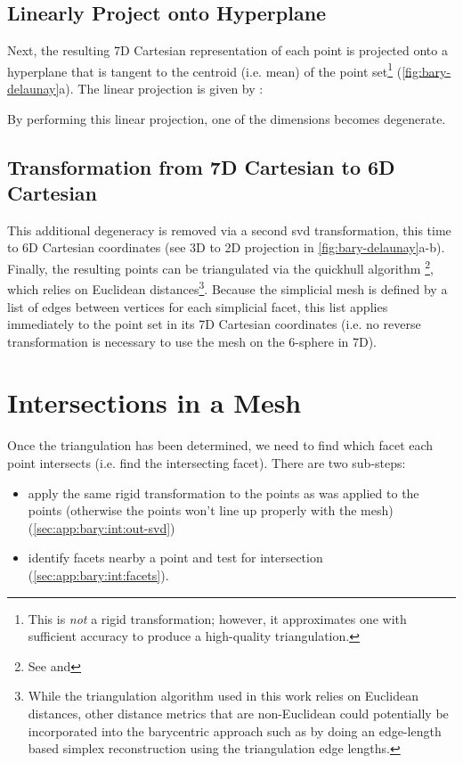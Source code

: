 \documentclass[final,12pt]{elsarticle}
\begin{document}
\subsection{Linearly Project onto Hyperplane}
\label{sec:app:bary:tri:project}
Next, the resulting 7D Cartesian representation of each point is projected onto a hyperplane that is tangent to the centroid (i.e. mean) of the point set\footnote{This is \textit{not} a rigid transformation; however, it approximates one with sufficient accuracy to produce a high-quality triangulation.} (\cref{fig:bary-delaunay}a). The linear projection is given by \cite{anatoliyCheckIfRay2015}:

By performing this linear projection, one of the dimensions becomes degenerate.

\subsection{ Transformation from 7D Cartesian to 6D Cartesian}
\label{sec:app:bary:tri:svd2}
This additional degeneracy is removed via a second \gls{svd} transformation, this time to 6D Cartesian coordinates (see 3D to 2D projection in \cref{fig:bary-delaunay}a-b). Finally, the resulting points can be triangulated via the quickhull algorithm \cite{barberQuickhullAlgorithmConvex1996}\footnote{See  and }, which relies on Euclidean distances\footnote{While the triangulation algorithm used in this work relies on Euclidean distances, other distance metrics that are non-Euclidean \cite{morawiecDistancesGrainInterfaces2019} could potentially be incorporated into the barycentric approach such as by doing an edge-length based simplex reconstruction \cite{connorHighdimensionalSimplexesSupermetric2017,boissonnatOnlyDistancesAre2017} using the triangulation edge lengths.}. Because the simplicial mesh is defined by a list of edges between vertices for each simplicial facet, this list applies immediately to the point set in its 7D Cartesian coordinates (i.e. no reverse transformation is necessary to use the mesh on the 6-sphere in 7D).

\section{Intersections in a Mesh}
\label{sec:app:bary:int}

Once the triangulation has been determined, we need to find which facet each \outpt{} point intersects (i.e. find the intersecting facet). There are two sub-steps:
\begin{itemize}%
	\item[2.1] apply the same rigid transformation to the \outpt{} points as was applied to the \inpt{} points (otherwise the \outpt{} points won't line up properly with the mesh) (\cref{sec:app:bary:int:out-svd})
	\item[2.2] identify facets nearby a \outpt{} point and test for intersection (\cref{sec:app:bary:int:facets}).
\end{itemize}
\end{document}
